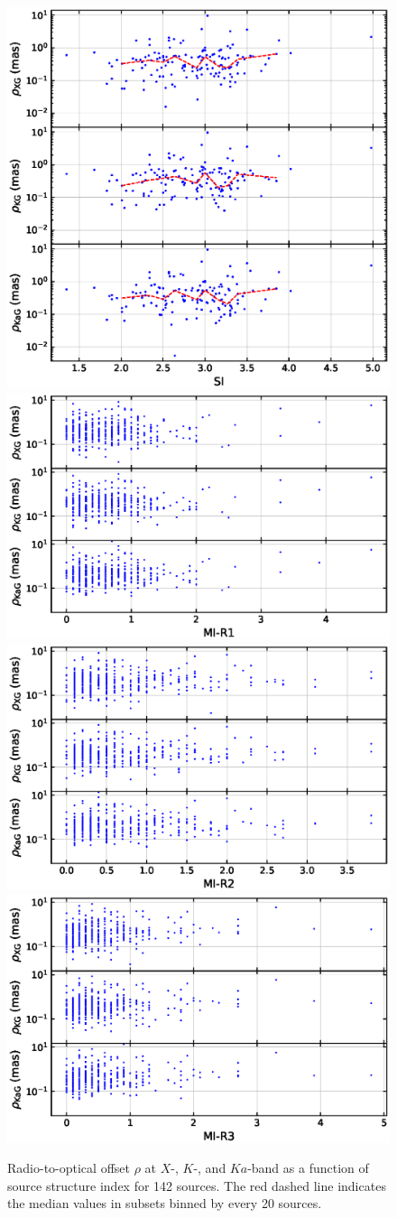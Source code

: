 \documentclass{aa}
\begin{document}
    \begin{figure}[hbtp]
        \centering
        \includegraphics[width=0.6\columnwidth]{figs/rho-si}
        \includegraphics[width=0.6\columnwidth]{figs/rho-I1R}
        \includegraphics[width=0.6\columnwidth]{figs/rho-I2R}
        \includegraphics[width=0.6\columnwidth]{figs/rho-I3R}
        \caption[]{\label{fig:rho-vs-si}
            Radio-to-optical offset $\rho$ at $X$-, $K$-, and $Ka$-band as a function of source structure index for 142 sources.
            The red dashed line indicates the median values in subsets binned by every 20 sources.
        }
    \end{figure}
\end{document}

